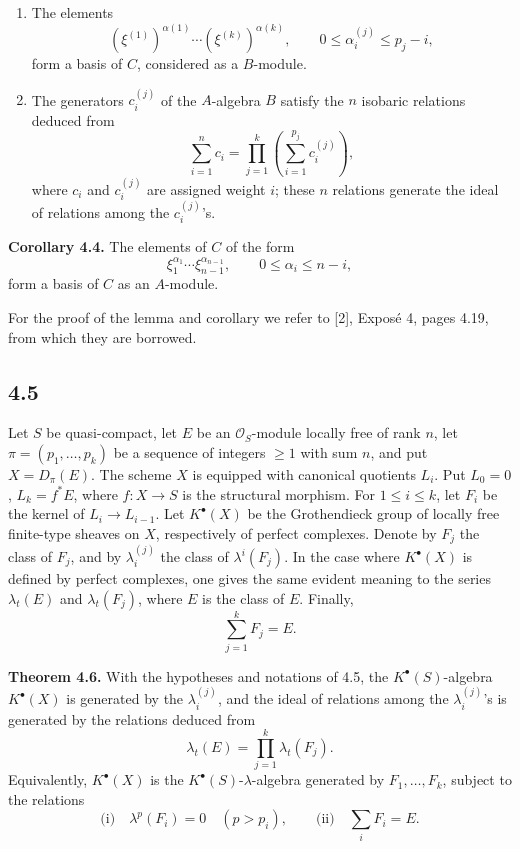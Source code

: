 \documentclass[11pt]{article}
\begin{document}
\begin{enumerate}[label=\textup{\roman*)}]
\item The elements
\[
  (\xi^{(1)})^{\alpha(1)}\cdots(\xi^{(k)})^{\alpha(k)},
  \qquad 0\leq \alpha_i^{(j)}\leq p_j-i,
\]
form a basis of \(C\), considered as a \(B\)-module.
\item The generators \(c_i^{(j)}\) of the \(A\)-algebra \(B\) satisfy the \(n\) isobaric relations deduced from
\[
  \sum_{i=1}^n c_i
  =
  \prod_{j=1}^{k}\left(\sum_{i=1}^{p_j} c_i^{(j)}\right),
\]
where \(c_i\) and \(c_i^{(j)}\) are assigned weight \(i\); these \(n\) relations generate the ideal of relations among the \(c_i^{(j)}\)'s.
\end{enumerate}

\textbf{Corollary 4.4.} The elements of \(C\) of the form
\[
  \xi_1^{\alpha_1}\cdots \xi_{n-1}^{\alpha_{n-1}},
  \qquad 0\leq \alpha_i\leq n-i,
\]
form a basis of \(C\) as an \(A\)-module.

For the proof of the lemma and corollary we refer to [2], Exposé 4, pages 4.19, from which they are borrowed.

\subsection*{4.5}
Let \(S\) be quasi-compact, let \(E\) be an \(\mathcal O_S\)-module locally free of rank \(n\), let \(\pi=(p_1,\ldots,p_k)\) be a sequence of integers \(\geq 1\) with sum \(n\), and put \(X=D_\pi(E)\). The scheme \(X\) is equipped with canonical quotients \(L_i\). Put \(L_0=0\), \(L_k=f^*E\), where \(f:X\to S\) is the structural morphism. For \(1\leq i\leq k\), let \(F_i\) be the kernel of \(L_i\to L_{i-1}\). Let \(K^\bullet(X)\) be the Grothendieck group of locally free finite-type sheaves on \(X\), respectively of perfect complexes. Denote by \(F_j\) the class of \(F_j\), and by \(\lambda_i^{(j)}\) the class of \(\lambda^i(F_j)\). In the case where \(K^\bullet(X)\) is defined by perfect complexes, one gives the same evident meaning to the series \(\lambda_t(E)\) and \(\lambda_t(F_j)\), where \(E\) is the class of \(E\). Finally,
\[
  \sum_{j=1}^{k}F_j=E.
\]

\textbf{Theorem 4.6.} With the hypotheses and notations of 4.5, the \(K^\bullet(S)\)-algebra \(K^\bullet(X)\) is generated by the \(\lambda_i^{(j)}\), and the ideal of relations among the \(\lambda_i^{(j)}\)'s is generated by the relations deduced from
\[
  \lambda_t(E)=\prod_{j=1}^{k}\lambda_t(F_j).
\]
Equivalently, \(K^\bullet(X)\) is the \(K^\bullet(S)\)-\(\lambda\)-algebra generated by \(F_1,\ldots,F_k\), subject to the relations
\[
  \text{(i)}\quad \lambda^p(F_i)=0\quad(p>p_i),
  \qquad
  \text{(ii)}\quad \sum_i F_i=E.
\]
\end{document}
